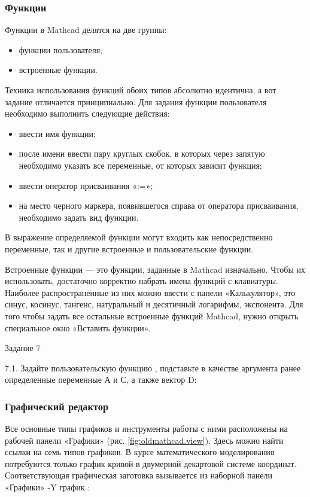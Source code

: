 \subsubsection{Функции}
Функции в Mathcad делятся на две группы:
\begin{itemize}
\item функции пользователя;
\item встроенные функции.
\end{itemize}
Техника использования функций обоих типов абсолютно идентична, а вот задание отличается принципиально. Для задания функции пользователя необходимо выполнить следующие действия:
\begin{itemize}
\item ввести имя функции;
\item после имени ввести пару круглых скобок, в которых через запятую необходимо указать все переменные, от которых зависит функция;
\item ввести оператор присваивания «:=»;
\item на место черного маркера, появившегося справа от оператора присваивания, необходимо задать вид функции.
\end{itemize}

В выражение определяемой функции могут входить как непосредственно переменные, так и другие встроенные и пользовательские функции. 



Встроенные функции --- это функции, заданные в Mathcad изначально. Чтобы их использовать, достаточно корректно набрать имена функций с клавиатуры. Наиболее распространенные из них можно ввести с панели «Калькулятор», это синус, косинус, тангенс, натуральный и десятичный логарифмы, экспонента. Для того чтобы задать все остальные встроенные функций Mathcad, нужно открыть специальное окно «Вставить функции».

Задание 7

7.1. Задайте пользовательскую функцию , 
подставьте в качестве аргумента ранее определенные переменные А и С, а также вектор D:


\subsubsection{Графический редактор}
Все основные типы графиков и инструменты работы с ними расположены на рабочей панели «Графики» (рис. \ref{fig:oldmathcad.view}). Здесь можно найти ссылки на семь типов графиков. В курсе математического моделирования потребуются только график кривой в двумерной декартовой системе координат. Соответствующая графическая заготовка вызывается из наборной панели «Графики» -Y график :



